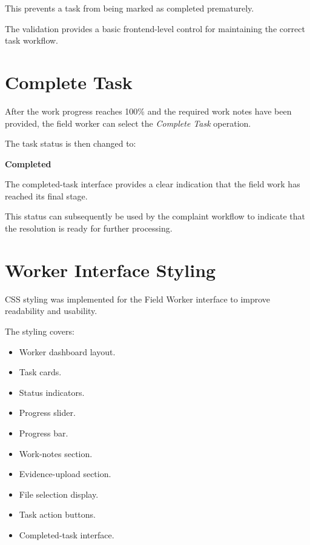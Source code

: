 \documentclass[12pt,a4paper]{article}
\begin{document}
This prevents a task from being marked as completed prematurely.

The validation provides a basic frontend-level control for maintaining the
correct task workflow.

\section{Complete Task}

After the work progress reaches 100\% and the required work notes have been
provided, the field worker can select the \textit{Complete Task} operation.

The task status is then changed to:

\begin{center}
\textbf{Completed}
\end{center}

The completed-task interface provides a clear indication that the field
work has reached its final stage.

This status can subsequently be used by the complaint workflow to indicate
that the resolution is ready for further processing.

\section{Worker Interface Styling}

CSS styling was implemented for the Field Worker interface to improve
readability and usability.

The styling covers:

\begin{itemize}
    \item Worker dashboard layout.
    \item Task cards.
    \item Status indicators.
    \item Progress slider.
    \item Progress bar.
    \item Work-notes section.
    \item Evidence-upload section.
    \item File selection display.
    \item Task action buttons.
    \item Completed-task interface.
\end{itemize}
\end{document}
